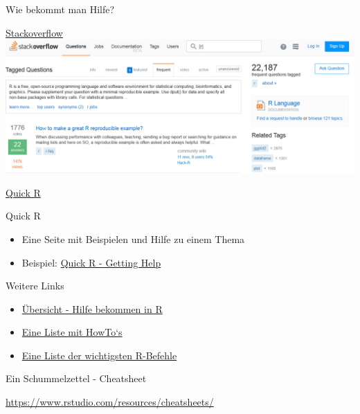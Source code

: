\documentclass[ignorenonframetext,]{beamer}
\providecommand{\tightlist}{%
\setlength{\itemsep}{0pt}\setlength{\parskip}{0pt}}
\begin{document}
\begin{frame}[fragile]{Wie bekommt man Hilfe?}
\begin{block}{\href{http://stackoverflow.com/}{Stackoverflow}}
\includegraphics{./tex2pdf.9796/b355b991b8b67437045666b49510802f4d9ef989.png}

\end{block}

\begin{block}{\href{http://www.statmethods.net/interface/help.html}{Quick
R}}

\begin{block}{Quick R}

\begin{itemize}
\tightlist
\item
  Eine Seite mit Beispielen und Hilfe zu einem Thema
\item
  Beispiel: \href{http://www.statmethods.net/interface/help.html}{Quick
  R - Getting Help}
\end{itemize}

\end{block}

\begin{block}{Weitere Links}

\begin{itemize}
\item
  \href{https://www.r-project.org/help.html}{Übersicht - Hilfe bekommen
  in R}
\item
  \href{http://rprogramming.net/}{Eine Liste mit HowTo`s}
\item
  \href{https://www.personality-project.org/r/r.commands.html}{Eine
  Liste der wichtigsten R-Befehle}
\end{itemize}

\end{block}

\end{block}

\begin{block}{Ein Schummelzettel - Cheatsheet}

\url{https://www.rstudio.com/resources/cheatsheets/}


\end{block}
\end{frame}
\end{document}
